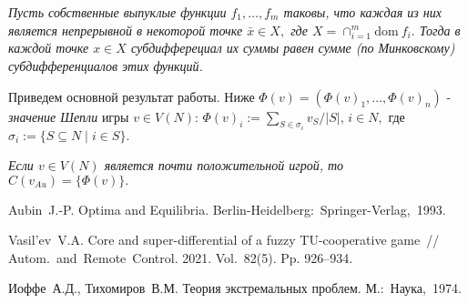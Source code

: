  \cite{IT74} {\it Пусть собственные
выпуклые функции $f_1, \ldots, f_m$ таковы, что каждая из них
является непрерывной в некоторой точке $\bar{x} \in X,$ где $X =
\cap_{i=1}^m \mbox{dom}~f_i.$ Тогда в каждой точке $x \in X$
субдифферециал их суммы равен сумме (по Минковскому)
субдифференциалов этих функций.}

Приведем основной результат работы. Ниже $\Phi(v) = (\Phi(v)_1, \ldots, \Phi(v)_n)$ - {\it значение Шепли} игры $v \in V(N)$: $\Phi(v)_i := \sum_{S \in \sigma_i}v_S/|S|, \, i \in N,$ где $\sigma_i := \{S \subseteq N \mid i \in S\}.$

 {\it Если $v \in V(N)$ является почти по\-ло\-жи\-тель\-ной игрой, то $C(v_{Au}) = \{\Phi(v)\}.$}



%

%

\begin{thebibliography}{9} %

Aubin~J.-P. Optima and Equilibria. Berlin-Heidelberg:~Springer-Verlag,~1993.

Vasil'ev~V.A. Core and super-differential of a fuzzy TU-cooperative game~// Autom.~and~Remote~Control. 2021. Vol.~82(5). Pp. 926--934.

Иоффе~А.Д., Тихомиров~В.М. Теория экстремальных проблем. М.:~Наука,~1974.

\end{thebibliography}





%
